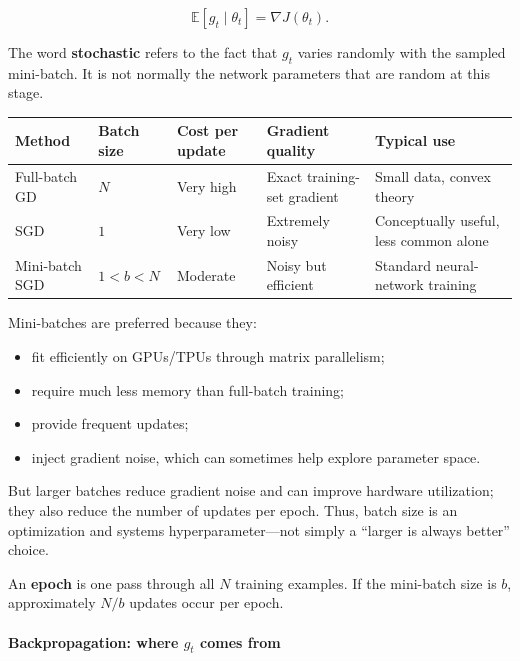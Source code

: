 \documentclass[11pt,a4paper]{article}
\theoremstyle{definition}
\begin{document}
\[
\mathbb{E}[g_t \mid \theta_t] = \nabla J(\theta_t).
\]

The word \textbf{stochastic} refers to the fact that $g_t$ varies randomly with the sampled mini-batch. It is not normally the network parameters that are random at this stage.

{\footnotesize
\setlength{\tabcolsep}{3pt}
\renewcommand{\arraystretch}{1.2}
\noindent
\begin{tabularx}{\linewidth}{|
  >{\raggedright\arraybackslash}p{2.2cm}|
  >{\raggedright\arraybackslash}p{1.5cm}|
  >{\raggedright\arraybackslash}p{2cm}|
  >{\raggedright\arraybackslash}X|
  >{\raggedright\arraybackslash}X|
}
\hline
\textbf{Method} & \textbf{Batch size} & \textbf{Cost per update} & \textbf{Gradient quality} & \textbf{Typical use} \\
\hline
Full-batch GD & $N$ & Very high & Exact training-set gradient & Small data, convex theory \\
\hline
SGD & $1$ & Very low & Extremely noisy & Conceptually useful, less common alone \\
\hline
Mini-batch SGD & $1 < b < N$ & Moderate & Noisy but efficient & Standard neural-network training \\
\hline
\end{tabularx}
}

Mini-batches are preferred because they:
\begin{itemize}
    \item fit efficiently on GPUs/TPUs through matrix parallelism;
    \item require much less memory than full-batch training;
    \item provide frequent updates;
    \item inject gradient noise, which can sometimes help explore parameter space.
\end{itemize}

But larger batches reduce gradient noise and can improve hardware utilization; they also reduce the number of updates per epoch. Thus, batch size is an optimization and systems hyperparameter—not simply a ``larger is always better'' choice.

An \textbf{epoch} is one pass through all $N$ training examples. If the mini-batch size is $b$, approximately $N/b$ updates occur per epoch.

\paragraph{Backpropagation: where $g_t$ comes from}
\end{document}
